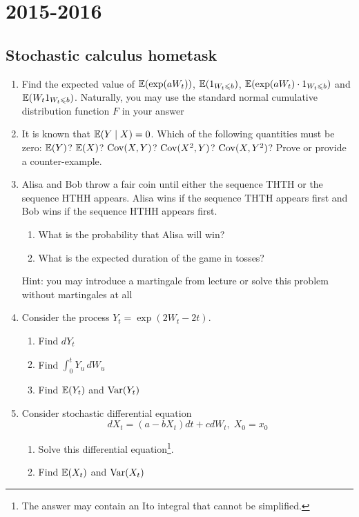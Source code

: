 \documentclass[12pt, a4paper]{article}
\begin{document}
\section{2015-2016}

\subsection{Stochastic calculus hometask}


\begin{enumerate}

\item Find the expected value of $\operatorname{\mathbb{E}}(\exp(aW_t))$, $\operatorname{\mathbb{E}}(1_{W_t\leqslant b})$, $\operatorname{\mathbb{E}}(\exp(aW_t)\cdot 1_{W_t\leqslant b})$ and $\operatorname{\mathbb{E}}(W_t 1_{W_t\leqslant b})$. Naturally, you may use the standard normal cumulative distribution function $F$ in your answer


\item It is known that $\operatorname{\mathbb{E}}(Y \mid X)=0$. Which of the following quantities must be zero: $\operatorname{\mathbb{E}}(Y)$? $\operatorname{\mathbb{E}}(X)$? $\operatorname{Cov}(X,Y)$? $\operatorname{Cov}(X^2,Y)$? $\operatorname{Cov}(X,Y^2)$? Prove or provide a counter-example.

\item Alisa and Bob throw a fair coin until either the sequence THTH or the sequence HTHH appears. Alisa wins if the sequence THTH appears first and Bob wins if the sequence HTHH appears first.
\begin{enumerate}
\item What is the probability that Alisa will win?
\item What is the expected duration of the game in tosses?
\end{enumerate}

Hint: you may introduce a martingale from lecture or solve this problem without martingales at all

\item Consider the process $Y_t=\exp(2W_t-2t)$.

\begin{enumerate}
\item Find $dY_t$
\item Find $\int_0^t Y_u \, dW_u$
\item Find $\operatorname{\mathbb{E}}(Y_t)$ and $\operatorname{Var}(Y_t)$
\end{enumerate}

\item Consider stochastic differential equation
\[
dX_t = (a - bX_t) dt + c dW_t, \; X_0=x_0
\]

\begin{enumerate}
\item Solve this differential equation\footnote{The answer may contain an Ito integral that cannot be simplified.}.
\item Find $\operatorname{\mathbb{E}}(X_t)$ and $\operatorname{Var}(X_t)$
\end{enumerate}


\end{enumerate}
\end{document}
